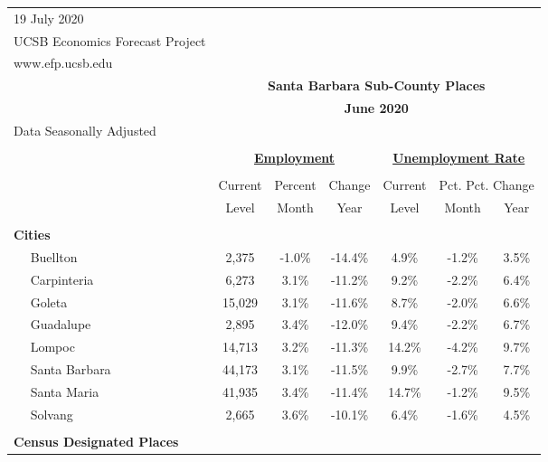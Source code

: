 \documentclass[12pt]{article}
\begin{document}
\begin{landscape}
\begin{table}
\begin{tabular}{|l|c|c|c||c|c|c|}
\multicolumn{1}{l}{\small 19 July 2020} & \multicolumn{6}{c}{} \\
\multicolumn{1}{l}{\small UCSB Economics Forecast Project} & \multicolumn{6}{c}{} \\
\multicolumn{1}{l}{\small www.efp.ucsb.edu} & \multicolumn{6}{c}{} \\
\multicolumn{1}{c}{} & \multicolumn{6}{c}{\large \textbf{Santa Barbara Sub-County Places}} \\
\multicolumn{1}{c}{} & \multicolumn{6}{c}{\large \textbf{June 2020}} \\
\multicolumn{7}{l}{\small Data Seasonally Adjusted} \\ \hline \hline
& \multicolumn{5}{c}{} & \\
& \multicolumn{3}{c}{\textbf{\underline{Employment}} } & \multicolumn{3}{c}{\textbf{\underline{Unemployment Rate}} } \vline \\
& \multicolumn{2}{c}{} & & \multicolumn{2}{c}{} & \\
& Current & \multicolumn{1}{r}{Percent} & Change & Current & \multicolumn{2}{c}{Pct. Pct. Change} \vline \\
& Level & Month & Year & Level & Month & Year \\ \hline
&&&&&& \\
\textbf{Cities} &&&&&& \\
$\quad$ Buellton & 2,375 & -1.0\% & -14.4\% & 4.9\% & -1.2\% & 3.5\% \\
$\quad$ Carpinteria & 6,273 & 3.1\% & -11.2\% & 9.2\% & -2.2\% & 6.4\% \\
$\quad$ Goleta & 15,029 & 3.1\% & -11.6\% & 8.7\% & -2.0\% & 6.6\% \\
$\quad$ Guadalupe & 2,895 & 3.4\% & -12.0\% & 9.4\% & -2.2\% & 6.7\% \\
$\quad$ Lompoc & 14,713 & 3.2\% & -11.3\% & 14.2\% & -4.2\% & 9.7\% \\
$\quad$ Santa Barbara & 44,173 & 3.1\% & -11.5\% & 9.9\% & -2.7\% & 7.7\% \\
$\quad$ Santa Maria & 41,935 & 3.4\% & -11.4\% & 14.7\% & -1.2\% & 9.5\% \\
$\quad$ Solvang & 2,665 & 3.6\% & -10.1\% & 6.4\% & -1.6\% & 4.5\% \\
&&&&&& \\
\textbf{Census Designated Places} &&&&&& \\

\end{tabular}
\end{table}
\end{landscape}
\end{document}
